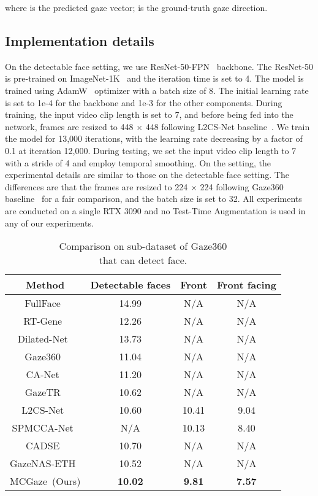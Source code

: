 \documentclass[journal]{IEEEtran}
\begin{document}
where  is the predicted gaze vector;  is the ground-truth gaze direction. 
\subsection{Implementation details}
On the detectable face setting, we use ResNet-50-FPN~\cite{he2016deep,lin2017feature} backbone. 
The ResNet-50 is pre-trained on ImageNet-1K~\cite{deng2009imagenet} and the iteration time  is set to 4. The model is trained using AdamW~\cite{adam} optimizer with a batch size of 8. The initial learning rate is set to 1e-4 for the backbone and 1e-3 for the other components. During training, the input video clip length is set to 7, and before being fed into the network, frames are resized to 448 × 448 following L2CS-Net baseline~\cite{abdelrahman2022l2cs}. We train the model for 13,000 iterations, with the learning rate decreasing by a factor of 0.1 at iteration 12,000. During testing, we set the input video clip length to 7 with a stride of 4 and employ temporal smoothing.
On the  setting, the experimental details are similar to those on the detectable face setting. The differences are that the frames are resized to 224 × 224 following Gaze360 baseline~\cite{kellnhofer2019gaze360} for a fair comparison, and the batch size is set to 32. 
All experiments are conducted on a single RTX 3090 and no Test-Time Augmentation is used in any of our experiments.


\begin{table}[t]
\vspace{-6mm}
\setlength{\abovecaptionskip}{0cm}  \setlength{\belowcaptionskip}{-0.2cm} \caption{Comparison on sub-dataset of Gaze360\\ that can detect face.}
\centering
\tiny
\setlength{\tabcolsep}{3pt}
\begin{tabular}{c|ccc}
 \hline
Method & Detectable faces & Front & Front facing\\
 \hline
FullFace~\cite{zhang2017s} & 14.99 & N/A & N/A \\
RT-Gene~\cite{fischer2018rt} & 12.26 & N/A & N/A \\
Dilated-Net~\cite{chen2019appearance} & 13.73 & N/A & N/A \\
Gaze360~\cite{kellnhofer2019gaze360} & 11.04 & N/A & N/A \\
CA-Net~\cite{cheng2020coarse} & 11.20 & N/A & N/A \\
GazeTR~\cite{cheng2022gaze} & 10.62 & N/A & N/A \\
L2CS-Net~\cite{abdelrahman2022l2cs} & 10.60 & 10.41 & 9.04\\
SPMCCA-Net~\cite{yan2023gaze} & N/A & 10.13 & 8.40\\
CADSE~\cite{CADSE} & 10.70 & N/A & N/A\\
GazeNAS-ETH~\cite{NASgaze2023} & 10.52 & N/A & N/A\\
 \hline
MCGaze~(Ours) & \textbf{10.02} & \textbf{9.81} & \textbf{7.57} \\
 \hline
\end{tabular}
\label{tab: sub-dataset1}
\vspace{-4mm}
\end{table}
\end{document}
